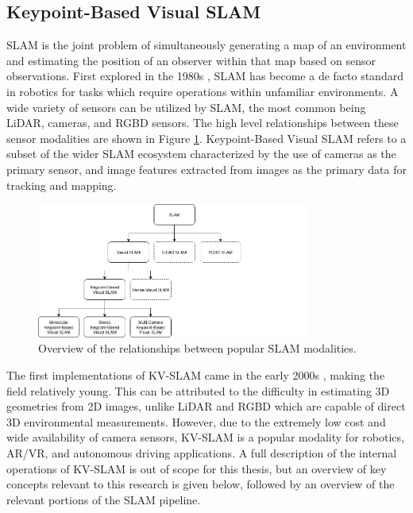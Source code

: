 \subsection{Keypoint-Based Visual SLAM}
\label{sec:kv_slam_background}

SLAM is the joint problem of simultaneously generating a map of an environment and estimating the position of an observer within that map based on sensor observations. First explored in the 1980s \cite{smithEstimatingUncertainSpatial1988}, SLAM has become a de facto standard in robotics for tasks which require operations within unfamiliar environments. A wide variety of sensors can be utilized by SLAM, the most common being LiDAR, cameras, and RGBD sensors. The high level relationships between these sensor modalities are shown in Figure \ref{fig:slam_family_tree}. Keypoint-Based Visual SLAM refers to a subset of the wider SLAM ecosystem characterized by the use of cameras as the primary sensor, and image features extracted from images as the primary data for tracking and mapping.

\begin{figure}[!ht]
    \centering
    \includegraphics[width=0.8\textwidth]{resources/slam_family_tree.png}
    \caption[SLAM Family Tree]{Overview of the relationships between popular SLAM modalities.}
    \label{fig:slam_family_tree}
\end{figure}

The first implementations of KV-SLAM came in the early 2000s \cite{seMobileRobotLocalization2002}\cite{davisonRealtimeSimultaneousLocalisation2003}, making the field relatively young. This can be attributed to the difficulty in estimating 3D geometries from 2D images, unlike LiDAR and RGBD which are capable of direct 3D environmental measurements. However, due to the extremely low cost and wide availability of camera sensors, KV-SLAM is a popular modality for robotics, AR/VR, and autonomous driving applications. A full description of the internal operations of KV-SLAM is out of scope for this thesis, but an overview of key concepts relevant to this research is given below, followed by an overview of the relevant portions of the SLAM pipeline.

